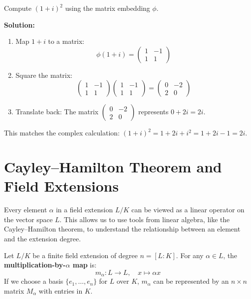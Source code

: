 \begin{example}
Compute $(1+i)^2$ using the matrix embedding $\phi$.

\textbf{Solution:}\newline
\begin{enumerate}
    \item Map $1+i$ to a matrix:
    \[ \phi(1+i) = \begin{pmatrix} 1 & -1 \\ 1 & 1 \end{pmatrix} \]
    \item Square the matrix:
    \[ \begin{pmatrix} 1 & -1 \\ 1 & 1 \end{pmatrix} \begin{pmatrix} 1 & -1 \\ 1 & 1 \end{pmatrix} = \begin{pmatrix} 0 & -2 \\ 2 & 0 \end{pmatrix} \]
    \item Translate back:
    The matrix $\begin{pmatrix} 0 & -2 \\ 2 & 0 \end{pmatrix}$ represents $0 + 2i = 2i$.
\end{enumerate}
This matches the complex calculation: $(1+i)^2 = 1 + 2i + i^2 = 1 + 2i - 1 = 2i$.
\end{example}

\section{Cayley--Hamilton Theorem and Field Extensions}

Every element $\alpha$ in a field extension $L/K$ can be viewed as a linear operator on the vector space $L$. This allows us to use tools from linear algebra, like the Cayley--Hamilton theorem, to understand the relationship between an element and the extension degree.

\begin{definition}
Let $L/K$ be a finite field extension of degree $n = [L:K]$. For any $\alpha \in L$, the \textbf{multiplication-by-$\alpha$ map} is:
\[ m_\alpha: L \to L, \quad x \mapsto \alpha x \]
If we choose a basis $\{e_1, \dots, e_n\}$ for $L$ over $K$, $m_\alpha$ can be represented by an $n \times n$ matrix $M_\alpha$ with entries in $K$.
\end{definition}

